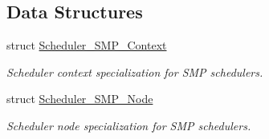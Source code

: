 \subsection*{Data Structures}
\begin{DoxyCompactItemize}
\item 
struct \mbox{\hyperlink{structScheduler__SMP__Context}{Scheduler\+\_\+\+S\+M\+P\+\_\+\+Context}}
\begin{DoxyCompactList}\small\item\em Scheduler context specialization for S\+MP schedulers. \end{DoxyCompactList}\item 
struct \mbox{\hyperlink{structScheduler__SMP__Node}{Scheduler\+\_\+\+S\+M\+P\+\_\+\+Node}}
\begin{DoxyCompactList}\small\item\em Scheduler node specialization for S\+MP schedulers. \end{DoxyCompactList}\end{DoxyCompactItemize}
